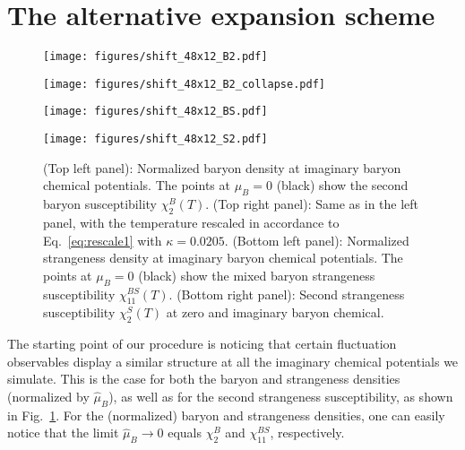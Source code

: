 \documentclass[a4paper,11pt]{article}
\newcommand \hmu {\hat{\mu}}
\begin{document}
\section{The alternative expansion scheme}
\label{sec-1}
\begin{figure}
\begin{minipage}{0.49\linewidth}
\texttt{[image: figures/shift\_48x12\_B2.pdf]} 
\end{minipage}
\begin{minipage}{0.51\linewidth}
\vspace{2.8mm}
\texttt{[image: figures/shift\_48x12\_B2\_collapse.pdf]} 
\end{minipage}
\begin{minipage}{0.49\linewidth}
\texttt{[image: figures/shift\_48x12\_BS.pdf]} 
\end{minipage}
\begin{minipage}{0.49\linewidth}
\vspace{0.6mm}
\texttt{[image: figures/shift\_48x12\_S2.pdf]} 
\end{minipage}
\vspace{-0mm}
\caption{(Top left panel): Normalized baryon density at imaginary baryon chemical 
potentials. The points at $\mu_B=0$ (black) show the second baryon susceptibility 
$\chi_2^B(T)$. (Top right panel): Same as in the left panel, with the temperature 
rescaled in accordance to Eq.~\eqref{eq:rescale1} with $\kappa=0.0205$. (Bottom left 
panel): Normalized strangeness density at imaginary baryon chemical 
potentials. The points at $\mu_B=0$ (black) show the mixed baryon strangeness 
susceptibility $\chi_{11}^{BS}(T)$. (Bottom right panel): Second strangeness 
susceptibility $\chi_{2}^{S}(T)$ at zero and imaginary baryon chemical.} 
\label{fig:final_kN}
\end{figure}

The starting point of our procedure is noticing that certain fluctuation observables 
display a similar structure at all the imaginary chemical potentials we simulate. This is the 
case for both the baryon and strangeness densities (normalized by $\hmu_B$), as well
as for the second strangeness susceptibility, as shown in Fig.~\ref{fig:final_kN}.  For 
the (normalized) baryon and strangeness densities, one can easily notice that the limit 
$\hmu_B \rightarrow 0$ equals $\chi_2^B$ and $\chi_{11}^{BS}$, respectively.
\end{document}
